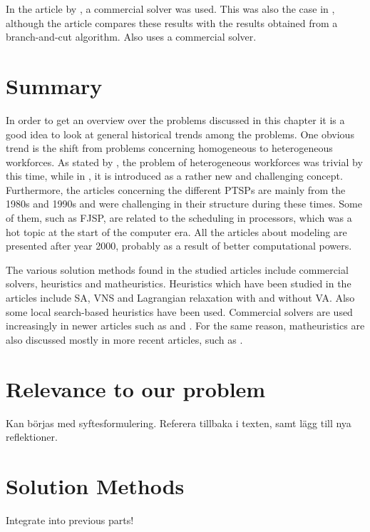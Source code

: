 In the article by \citet{eiselt_2008}, a commercial solver was used. This was also the case in \citet{mohan_2008}, although the article compares these results with the results obtained from a branch-and-cut algorithm. Also \cite{shahnazari_2013} uses a commercial solver.

\section{Summary}

In order to get an overview over the problems discussed in this chapter it is a good idea to look at general historical trends among the problems. One obvious trend is the shift from problems concerning homogeneous to heterogeneous workforces. As stated by \citet{krishnamoorthy_2012}, the problem of heterogeneous workforces was trivial by this time, while in \citet{loucks_1991}, it is introduced as a rather new and challenging concept. Furthermore, the articles concerning the different PTSPs are mainly from the 1980s and 1990s and were challenging in their structure during these times. Some of them, such as FJSP, are related to the scheduling in processors, which was a hot topic at the start of the computer era. All the articles about modeling are presented after year 2000, probably as a result of better computational powers.

The various solution methods found in the studied articles include commercial solvers, heuristics and matheuristics. Heuristics which have been studied in the articles include SA, VNS and Lagrangian relaxation with and without VA. Also some local search-based heuristics have been used. Commercial solvers are used increasingly in newer articles such as \citet{hojati_2011} and \citet{mohan_2008}. For the same reason, matheuristics are also discussed mostly in more recent articles, such as \citet{akbari_2013}.

\section{Relevance to our problem}



Kan börjas med syftesformulering. 
Referera tillbaka i texten, samt lägg till nya reflektioner.









\iffalse


\section{Solution Methods}
Integrate into previous parts!


